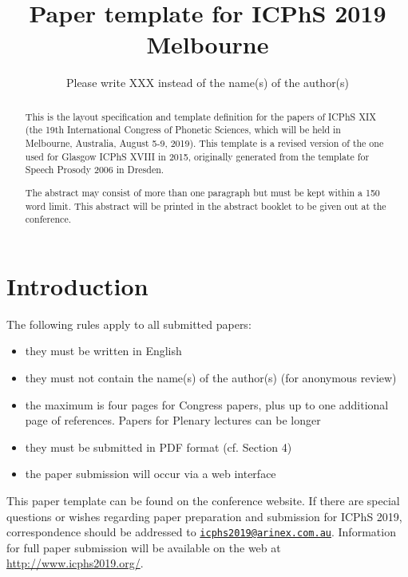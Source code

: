 \documentclass[
  a4paper,
  11pt,
  twocolumn]{article}
\author{}
\date{\vspace{-2.5em}}
\begin{document}
\title{Paper template for {ICPhS} 2019 Melbourne}
\author{Please write XXX instead of the name(s) of the author(s)}


\maketitle

\begin{abstract}
This is the layout specification and template definition for the papers of 
ICPhS XIX (the 19th International Congress of Phonetic Sciences, which will be 
held in Melbourne, Australia, August 5-9, 2019). This template is a revised 
version of the one used for Glasgow ICPhS XVIII in 2015, originally generated 
from the template for Speech Prosody 2006 in Dresden.

The abstract may consist of more than one paragraph but must be kept within a 
150 word limit. This abstract will be printed in the abstract booklet to be 
given out at the conference.
\end{abstract}



\section{Introduction}

The following rules apply to all submitted papers:

\begin{itemize}
  \item they must be written in English
  \item they must not contain the name(s) of the author(s) (for anonymous 
  review)
  \item the maximum is four pages for Congress papers, plus up to one 
  additional page of references. Papers for Plenary lectures can be longer
  \item they must be submitted in PDF format (cf. Section 4)
  \item the paper submission will occur via a web interface
\end{itemize}

This paper template can be found on the conference website. If there are
special questions or wishes regarding paper preparation and submission
for ICPhS 2019, correspondence should be addressed to
\href{mailto:icphs2019@arinex.com.au}{\nolinkurl{icphs2019@arinex.com.au}}.
Information for full paper submission will be available on the web at
\url{http://www.icphs2019.org/}.
\end{document}
